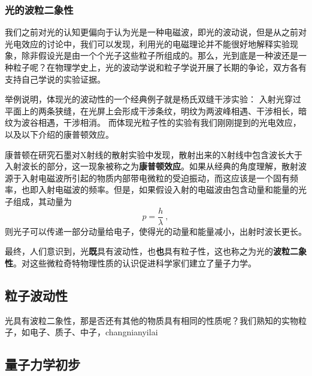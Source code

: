 \subsubsection{光的波粒二象性}
我们之前对光的认知更偏向于认为光是一种电磁波，即光的波动说，但是从之前对光电效应的讨论中，我们可以发现，利用光的电磁理论并不能很好地解释实验现象，除非假设光是由一个个光子这些粒子所组成的。那么，光到底是一种波还是一种粒子呢？在物理学史上，光的波动学说和粒子学说开展了长期的争论，双方各有支持自己学说的实验证据。

举例说明，体现光的波动性的一个经典例子就是杨氏双缝干涉实验：
入射光穿过平面上的两条狭缝，在光屏上会形成干涉条纹，明纹为两波峰相遇、干涉相长，暗纹为波谷相遇，干涉相消。
而体现光粒子性的实验有我们刚刚提到的光电效应，以及以下介绍的康普顿效应。

康普顿在研究石墨对X射线的散射实验中发现，散射出来的X射线中包含波长大于入射波长的部分，这一现象被称之为\textbf{康普顿效应}。如果从经典的角度理解，散射波源于入射电磁波所引起的物质内部带电微粒的受迫振动，而这应该是一个固有频率，也即入射电磁波的频率。但是，如果假设入射的电磁波由包含动量和能量的光子组成，其动量为$$p=\dfrac{h}{\lambda}~,$$则光子可以传递一部分动量给电子，使得光的动量和能量减小，出射时波长更长。

最终，人们意识到，光\textbf{既}具有波动性，也\textbf{也}具有粒子性，这也称之为光的\textbf{波粒二象性}。对这些微粒奇特物理性质的认识促进科学家们建立了量子力学。


\subsection{粒子波动性}
光具有波粒二象性，那是否还有其他的物质具有相同的性质呢？我们熟知的实物粒子，如电子、质子、中子，changnianyilai
\subsection{量子力学初步}

% 
% 
